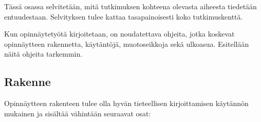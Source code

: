 \documentclass[english,12pt,a4paper,pdftex,sci,utf8]{aaltothesis}
\begin{document}
T\"ass\"a osassa selvitet\"a\"an, mit\"a tutkimuksen kohteena olevasta
aiheesta tiedet\"a\"an entuudestaan. Selvityksen tulee kattaa
tasapainoisesti koko tutkimuskentt\"a.

Kun opinn\"aytety\"ot\"a kirjoitetaan, on noudatettava
ohjeita, jotka koskevat opinn\"aytteen rakennetta,
k\"ayt\"ant\"oj\"a, muotoseikkoja sek\"a ulkoasua. Esitell\"a\"an n\"ait\"a
ohjeita tarkemmin.


\subsection*{Rakenne}

Opinn\"aytteen rakenteen tulee olla hyv\"an tieteellisen
kirjoittamisen k\"ayt\"ann\"on mukainen ja sis\"alt\"a\"a v\"ahint\"a\"an seuraavat
osat:
\end{document}
